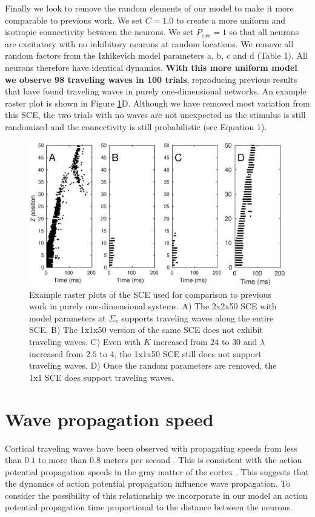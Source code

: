 Finally we look to remove the random elements of our model to make it more comparable to previous work.
We set $C=1.0$ to create a more uniform and isotropic connectivity between the neurons.
We set $P_{exc}=1$ so that all neurons are excitatory with no inhibitory neurons at random locations.
We remove all random factors from the Izhikevich model parameters a, b, c and d (Table 1).
All neurons therefore have identical dynamics.
\textbf{With this more uniform model we observe 98 traveling waves in 100 trials}, reproducing previous results that have found traveling waves in purely one-dimensional networks.
An example raster plot is shown in Figure \ref{fig:OneDimensionalRasterPlots}D.
Although we have removed most variation from this SCE, the two trials with no waves are not unexpected as the stimulus is still randomized and the connectivity is still probabilistic (see Equation 1).

\begin{figure}[!htb]
   \includegraphics[width=\textwidth]{fig/OneDimensionalComparison_RasterPlots}
   \caption{ Example raster plots of the SCE used for comparison to previous work in purely one-dimensional systems.
           A) The 2x2x50 SCE with model parameters at $\Sigma_v$ supports traveling waves along the entire SCE. 
	   B) The 1x1x50 version of the same SCE does not exhibit traveling waves.
	   C) Even with $K$ increased from $24$ to $30$ and $\lambda$ increased from $2.5$ to $4$, the 1x1x50 SCE still does not support traveling waves.
	   D) Once the random parameters are removed, the 1x1 SCE does support traveling waves. }
  \label{fig:OneDimensionalRasterPlots}
\end{figure}
\FloatBarrier

\section{Wave propagation speed} \label{sub:propagation_speed}
Cortical traveling waves have been observed with propagating speeds from less than $0.1$ to more than $0.8$ meters per second \citet{Sato2012}\citet{Golomb1997}\citet{Chervin1988}.
This is consistent with the action potential propagation speeds in the gray matter of the cortex \citet{Muller2018}. 
This suggests that the dynamics of action potential propagation influence wave propagation. 
To consider the possibility of this relationship we incorporate in our model an action potential propagation time proportional to the distance between the neurons.


